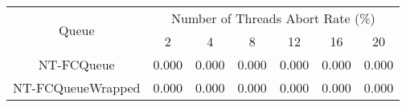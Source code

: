 \begin{tabular}{|c|c|c|c|c|c|c|}
\hline
\multirow{2}{*}{Queue} & \multicolumn{6}{c|}{Number of Threads Abort Rate (\%)}\\\cline{2-7}& 2 & 4 & 8 & 12 & 16 & 20\\
\hline
\hline
NT-FCQueue & 0.000 & 0.000 & 0.000 & 0.000 & 0.000 & 0.000\\
NT-FCQueueWrapped & 0.000 & 0.000 & 0.000 & 0.000 & 0.000 & 0.000\\
\hline\end{tabular}
